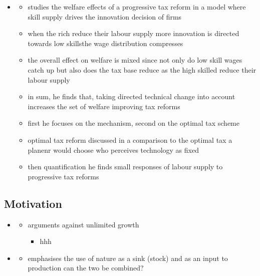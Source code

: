 \begin{itemize}
\item 
\cite{Loebbing2019NationalChange}
\begin{itemize}
	\item studies the welfare effects of a progressive tax reform in a model where skill supply drives the innovation decision of firms
	\item when the rich reduce their labour supply more \ar innovation is directed towards low skills\ar the wage distribution compresses
	\item the overall effect on welfare is mixed since not only do low skill wages catch up but also does the tax base reduce as the high skilled reduce their labour supply
	\item in sum, he finds that, taking directed technical change into account increases the set of welfare improving tax reforms 
	\item first he focuses on the mechanism, second on the optimal tax scheme
	\item optimal tax reform discussed in a comparison to the optimal tax a planenr would choose who perceives technology as fixed
	\item then quantification \ar he finds small responses of labour supply to progressive tax reforms
\end{itemize}
\end{itemize}


\subsection{Motivation}
\begin{itemize}
\item \cite{Schor2005SustainableReduction}
\begin{itemize}
	\item arguments against unlimited growth
	\begin{itemize}
\item hhh
	\end{itemize}
\end{itemize}
\item \cite{Dasgupta2021}
\begin{itemize}
\item emphasises the use of nature as a sink (stock) and as an input to production \ar can the two be combined?
\end{itemize}
\end{itemize}
